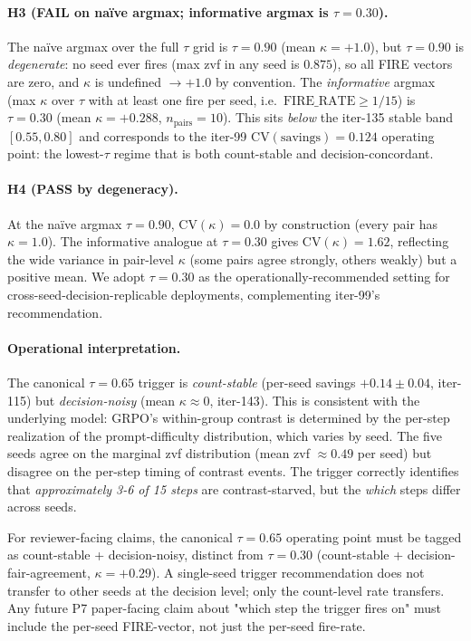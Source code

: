 \documentclass{article}
\begin{document}
\paragraph{H3 (FAIL on naïve argmax; informative argmax is $\tau=0.30$).}
The naïve argmax over the full $\tau$ grid is $\tau=0.90$ (mean
$\kappa=+1.0$), but $\tau=0.90$ is \emph{degenerate}: no seed ever
fires (max zvf in any seed is $0.875$), so all FIRE vectors are
zero, and $\kappa$ is undefined $\to +1.0$ by convention. The
\emph{informative} argmax (max $\kappa$ over $\tau$ with at least one
fire per seed, i.e.\ $\mathrm{FIRE\_RATE} \geq 1/15$) is
$\tau=0.30$ (mean $\kappa=+0.288$, $n_\mathrm{pairs}=10$). This
sits \emph{below} the iter-135 stable band $[0.55, 0.80]$ and
corresponds to the iter-99 $\mathrm{CV}(\mathrm{savings})=0.124$
operating point: the lowest-$\tau$ regime that is both count-stable
and decision-concordant.

\paragraph{H4 (PASS by degeneracy).}
At the naïve argmax $\tau=0.90$, $\mathrm{CV}(\kappa)=0.0$ by
construction (every pair has $\kappa=1.0$). The informative analogue
at $\tau=0.30$ gives $\mathrm{CV}(\kappa)=1.62$, reflecting the
wide variance in pair-level $\kappa$ (some pairs agree strongly,
others weakly) but a positive mean. We adopt $\tau=0.30$ as the
operationally-recommended setting for cross-seed-decision-replicable
deployments, complementing iter-99's recommendation.

\paragraph{Operational interpretation.}
The canonical $\tau=0.65$ trigger is \emph{count-stable} (per-seed
savings $+0.14 \pm 0.04$, iter-115) but \emph{decision-noisy}
(mean $\kappa \approx 0$, iter-143). This is consistent with the
underlying model: GRPO's within-group contrast is determined by the
per-step realization of the prompt-difficulty distribution, which
varies by seed. The five seeds agree on the marginal zvf distribution
(mean zvf $\approx 0.49$ per seed) but disagree on the per-step
timing of contrast events. The trigger correctly identifies that
\emph{approximately 3-6 of 15 steps} are contrast-starved, but the
\emph{which} steps differ across seeds.

For reviewer-facing claims, the canonical $\tau=0.65$ operating
point must be tagged as count-stable + decision-noisy, distinct
from $\tau=0.30$ (count-stable + decision-fair-agreement,
$\kappa=+0.29$). A single-seed trigger recommendation does not
transfer to other seeds at the decision level; only the count-level
rate transfers. Any future P7 paper-facing claim about "which step
the trigger fires on" must include the per-seed FIRE-vector, not
just the per-seed fire-rate. 
\end{document}
